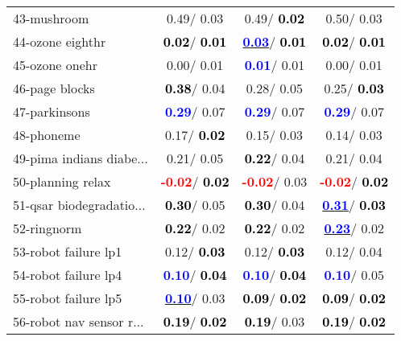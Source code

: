 \begin{table}[h]
\begin{center}
\begin{tabular}{lc|c|c}
43-mushroom &   0.49/  0.03 &   0.49/\textcolor{black}{\textbf{  0.02}} &   0.50/  0.03 \\
44-ozone eighthr & \textcolor{black}{\textbf{  0.02}}/\textcolor{black}{\textbf{  0.01}} & \underline{\textcolor{blue}{\textbf{  0.03}}}/\textcolor{black}{\textbf{  0.01}} & \textcolor{black}{\textbf{  0.02}}/\textcolor{black}{\textbf{  0.01}} \\
45-ozone onehr &   0.00/  0.01 & \textcolor{blue}{\textbf{  0.01}}/  0.01 &   0.00/  0.01 \\
46-page blocks & \textcolor{black}{\textbf{  0.38}}/  0.04 &   0.28/  0.05 &   0.25/\textcolor{black}{\textbf{  0.03}} \\ \hline
47-parkinsons & \textcolor{blue}{\textbf{  0.29}}/  0.07 & \textcolor{blue}{\textbf{  0.29}}/  0.07 & \textcolor{blue}{\textbf{  0.29}}/  0.07 \\
48-phoneme &   0.17/\textcolor{black}{\textbf{  0.02}} &   0.15/  0.03 &   0.14/  0.03 \\
49-pima indians diabe... &   0.21/  0.05 & \textcolor{black}{\textbf{  0.22}}/  0.04 &   0.21/  0.04 \\
50-planning relax & \textcolor{red}{\textbf{ -0.02}}/\textcolor{black}{\textbf{  0.02}} & \textcolor{red}{\textbf{ -0.02}}/  0.03 & \textcolor{red}{\textbf{ -0.02}}/\textcolor{black}{\textbf{  0.02}} \\
51-qsar biodegradatio... & \textcolor{black}{\textbf{  0.30}}/  0.05 & \textcolor{black}{\textbf{  0.30}}/  0.04 & \underline{\textcolor{blue}{\textbf{  0.31}}}/\textcolor{black}{\textbf{  0.03}} \\
52-ringnorm & \textcolor{black}{\textbf{  0.22}}/  0.02 & \textcolor{black}{\textbf{  0.22}}/  0.02 & \underline{\textcolor{blue}{\textbf{  0.23}}}/  0.02 \\
53-robot failure lp1 &   0.12/\textcolor{black}{\textbf{  0.03}} &   0.12/\textcolor{black}{\textbf{  0.03}} &   0.12/  0.04 \\ \hline
54-robot failure lp4 & \textcolor{blue}{\textbf{  0.10}}/\textcolor{black}{\textbf{  0.04}} & \textcolor{blue}{\textbf{  0.10}}/\textcolor{black}{\textbf{  0.04}} & \textcolor{blue}{\textbf{  0.10}}/  0.05 \\
55-robot failure lp5 & \underline{\textcolor{blue}{\textbf{  0.10}}}/  0.03 & \textcolor{black}{\textbf{  0.09}}/\textcolor{black}{\textbf{  0.02}} & \textcolor{black}{\textbf{  0.09}}/\textcolor{black}{\textbf{  0.02}} \\
56-robot nav sensor r... & \textcolor{black}{\textbf{  0.19}}/\textcolor{black}{\textbf{  0.02}} & \textcolor{black}{\textbf{  0.19}}/  0.03 & \textcolor{black}{\textbf{  0.19}}/\textcolor{black}{\textbf{  0.02}} \\

\end{tabular}
\end{center}
\end{table}
